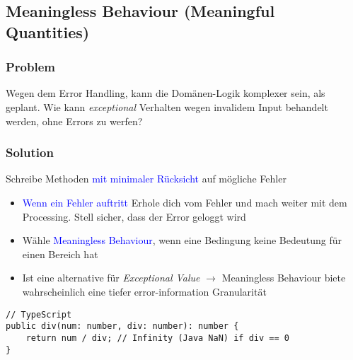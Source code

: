 \subsection{Meaningless Behaviour (Meaningful Quantities)}

\subsubsection{Problem}

Wegen dem Error Handling, kann die Domänen-Logik komplexer sein, als geplant. Wie kann \textit{exceptional} Verhalten wegen invalidem Input behandelt werden, ohne Errors zu werfen?

\subsubsection{Solution}
Schreibe Methoden \textcolor{blue}{mit minimaler Rücksicht} auf mögliche Fehler
\begin{itemize}
    \item \textcolor{blue}{Wenn ein Fehler auftritt} Erhole dich vom Fehler und mach weiter mit dem Processing. Stell sicher, dass der Error geloggt wird
    \item Wähle \textcolor{blue}{Meaningless Behaviour}, wenn eine Bedingung keine Bedeutung für einen Bereich hat
    \item Ist eine alternative für \textit{Exceptional Value} $\rightarrow$ Meaningless Behaviour biete wahrscheinlich eine tiefer error-information Granularität
\end{itemize}
\begin{lstlisting}
// TypeScript
public div(num: number, div: number): number {
    return num / div; // Infinity (Java NaN) if div == 0
}
\end{lstlisting}
